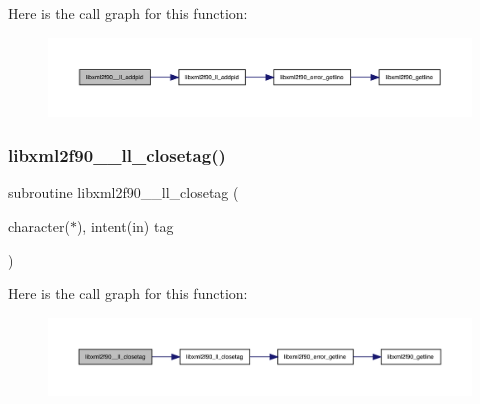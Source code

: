 Here is the call graph for this function\+:
\nopagebreak
\begin{figure}[H]
\begin{center}
\leavevmode
\includegraphics[width=350pt]{libxml2f90_8f90__pp_8f90_a27b88f71526165bff7aec413fad71028_cgraph}
\end{center}
\end{figure}
\mbox{\label{libxml2f90_8f90__pp_8f90_afd5fe490d70aae05e74fd17e87d31431}} 
\subsubsection{\texorpdfstring{libxml2f90\+\_\+\+\_\+ll\+\_\+closetag()}{libxml2f90\_\_ll\_closetag()}}
{\footnotesize\ttfamily subroutine libxml2f90\+\_\+\+\_\+ll\+\_\+closetag (\begin{DoxyParamCaption}\item[{character($\ast$), intent(in)}]{tag }\end{DoxyParamCaption})}

Here is the call graph for this function\+:
\nopagebreak
\begin{figure}[H]
\begin{center}
\leavevmode
\includegraphics[width=350pt]{libxml2f90_8f90__pp_8f90_afd5fe490d70aae05e74fd17e87d31431_cgraph}
\end{center}
\end{figure}
\mbox{\label{libxml2f90_8f90__pp_8f90_abe93b7544a083264c1c567ae64b7afa1}} 
